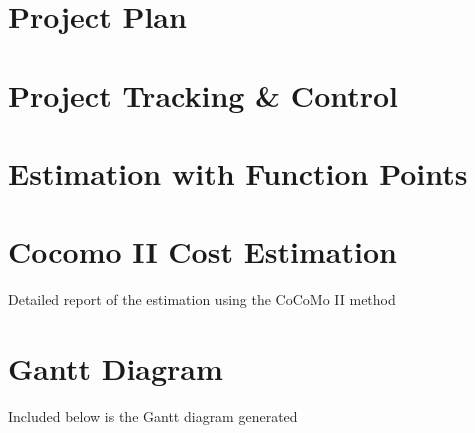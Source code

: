 \documentclass[11pt]{report}
\begin{document}
\chapter{Project Plan}
\label{chapPlan}



\chapter{Project Tracking \& Control}
\label{chapTracking}


\appendix

\chapter{Estimation with Function Points}
\label{chapFunctionPoints}


\chapter{Cocomo II Cost Estimation}
\label{chapCocomo}
\begin{table}[hbtp]
\centering

\caption{Detailed report of the estimation using the CoCoMo II method}
\label{tblCocomoDetail}
\end{table}


\chapter{Gantt Diagram}
\label{chapGantt}
Included below is the Gantt diagram generated


\end{document}
